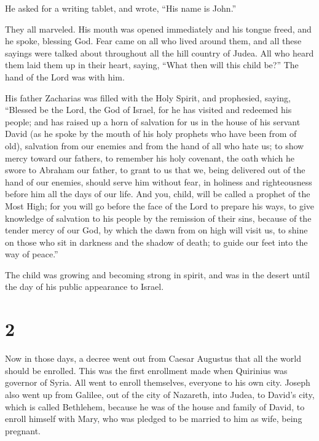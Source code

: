  He asked for a writing tablet, and wrote, ``His name is
John.''

They all marveled.  His mouth was opened immediately and
his tongue freed, and he spoke, blessing God.  Fear came on
all who lived around them, and all these sayings were talked about
throughout all the hill country of Judea.  All who heard
them laid them up in their heart, saying, ``What then will this child
be?'' The hand of the Lord was with him.

 His father Zacharias was filled with the Holy Spirit, and
prophesied, saying,  ``Blessed be the Lord, the God of
Israel, for he has visited and redeemed his people;  and
has raised up a horn of salvation for us in the house of his servant
David  (as he spoke by the mouth of his holy prophets who
have been from of old),  salvation from our enemies and
from the hand of all who hate us;  to show mercy toward our
fathers, to remember his holy covenant,  the oath which he
swore to Abraham our father,  to grant to us that we, being
delivered out of the hand of our enemies, should serve him without fear,
 in holiness and righteousness before him all the days of
our life.  And you, child, will be called a prophet of the
Most High; for you will go before the face of the Lord to prepare his
ways,  to give knowledge of salvation to his people by the
remission of their sins,  because of the tender mercy of
our God, by which the dawn from on high will visit us,  to
shine on those who sit in darkness and the shadow of death; to guide our
feet into the way of peace.''

 The child was growing and becoming strong in spirit, and
was in the desert until the day of his public appearance to Israel.

\hypertarget{section-1}{%
\section{2}\label{section-1}}

 Now in those days, a decree went out from Caesar Augustus
that all the world should be enrolled.  This was the first
enrollment made when Quirinius was governor of Syria.  All
went to enroll themselves, everyone to his own city.  Joseph
also went up from Galilee, out of the city of Nazareth, into Judea, to
David's city, which is called Bethlehem, because he was of the house and
family of David,  to enroll himself with Mary, who was
pledged to be married to him as wife, being pregnant.

